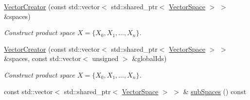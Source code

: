 \begin{DoxyCompactItemize}
\item 
\hyperlink{classSpacy_1_1ProductSpace_1_1VectorCreator_a73b6243d0ba00d019319e66bb06784dd}{Vector\+Creator} (const std\+::vector$<$ std\+::shared\+\_\+ptr$<$ \hyperlink{classSpacy_1_1VectorSpace}{Vector\+Space} $>$ $>$ \&spaces)
\begin{DoxyCompactList}\small\item\em Construct product space $ X = \{ X_0 , X_1 , \ldots , X_n \} $. \end{DoxyCompactList}\item 
\hyperlink{classSpacy_1_1ProductSpace_1_1VectorCreator_a63b039f3e2872a0488223121ed5eceb9}{Vector\+Creator} (const std\+::vector$<$ std\+::shared\+\_\+ptr$<$ \hyperlink{classSpacy_1_1VectorSpace}{Vector\+Space} $>$ $>$ \&spaces, const std\+::vector$<$ unsigned $>$ \&global\+Ids)
\begin{DoxyCompactList}\small\item\em Construct product space $ X = \{ X_0 , X_1 , \ldots , X_n \} $. \end{DoxyCompactList}\item 
const std\+::vector$<$ std\+::shared\+\_\+ptr$<$ \hyperlink{classSpacy_1_1VectorSpace}{Vector\+Space} $>$ $>$ \& \hyperlink{classSpacy_1_1ProductSpace_1_1VectorCreator_aa46303313c37f29cdfe54479d85cfe87}{sub\+Spaces} () const \hypertarget{classSpacy_1_1ProductSpace_1_1VectorCreator_aa46303313c37f29cdfe54479d85cfe87}{}\label{classSpacy_1_1ProductSpace_1_1VectorCreator_aa46303313c37f29cdfe54479d85cfe87}


\end{DoxyCompactItemize}
